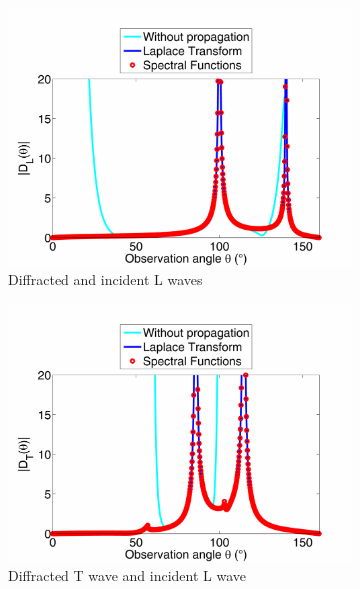 \begin{figure}
\centering
    \begin{subfigure}[b]{0.49\textwidth}
        \includegraphics[width=\textwidth]{images/chapter3/Figure9a.pdf}
        \caption{Diffracted and incident L waves}
        \label{16040LL}
    \end{subfigure}  
    \begin{subfigure}[b]{0.49\textwidth}
        \includegraphics[width=\textwidth]{images/chapter3/Figure9b.pdf}
        \caption{Diffracted T wave and incident L wave}
        \label{16040LT}
     \end{subfigure} \\   
     \begin{subfigure}[b]{0.49\textwidth}

\end{subfigure}
\end{figure}
